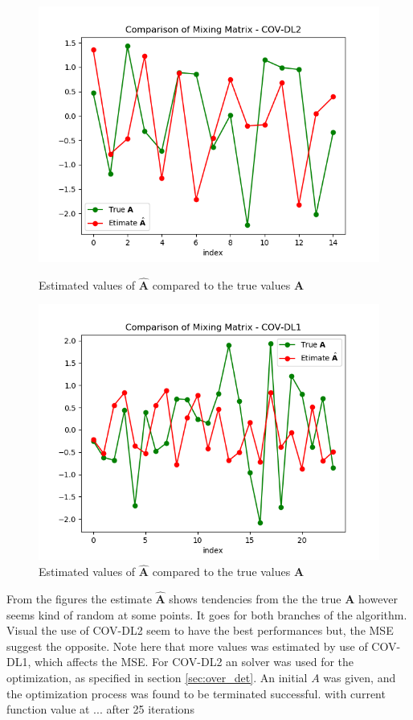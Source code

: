 \begin{figure}[H]
    \begin{minipage}[t]{.45\textwidth}
    	\centering
		\includegraphics[scale=0.5]{figures/ch_6/COV2_simple.png}
		\caption{Estimated values of $\hat{\textbf{A}}$ compared to the true 					values $\textbf{A}$}
		\label{fig:cov2_simple}
    \end{minipage} 
    \hfill
    \begin{minipage}[t]{.45\textwidth}
        \centering
		\includegraphics[scale=0.5]{figures/ch_6/COV1_simple.png}
		\caption{Estimated values of $\hat{\textbf{A}}$ compared to the true 				values $\textbf{A}$}
		\label{fig:cov1_simple}
    \end{minipage}
\end{figure}
From the figures the estimate $\hat{\textbf{A}}$ shows tendencies from the the true $\textbf{A}$ however seems kind of random at some points. It goes for both branches of the algorithm. Visual the use of COV-DL2 seem to have the best performances but, the MSE suggest the opposite. Note here that more values was estimated by use of COV-DL1, which affects the MSE.
For COV-DL2 an solver was used for the optimization, as specified in section \ref{sec:over_det}. An initial $A$ was given, and the optimization process was found to be terminated successful. with current function value at ... after 25 iterations 

